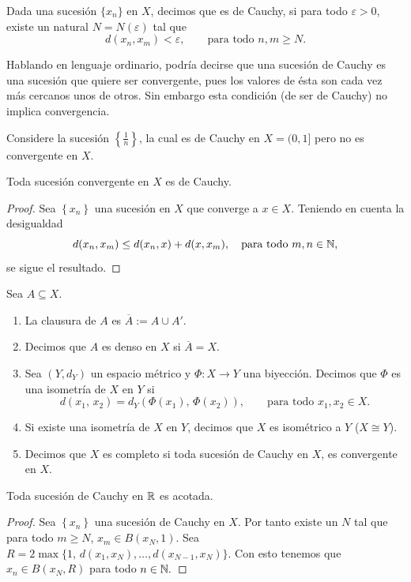 \begin{definicion}
Dada una sucesión $\{x_n\}$ en $X$, decimos que es de Cauchy, si para todo $\varepsilon >0$, existe un natural $N=N(\varepsilon)$ tal que \[d(x_n, x_m) <\varepsilon, \qquad \text{para todo $n,m \geq N$}.\]
\end{definicion}
Hablando en lenguaje ordinario, podría decirse que una sucesión de Cauchy es una sucesión que quiere ser convergente, pues los valores de ésta son cada vez más cercanos unos de otros. Sin embargo esta condición (de ser de Cauchy) no implica convergencia.

\begin{example}
Considere la sucesión $\left\{ \frac{1}{n}\right\}$, la cual es de Cauchy en $X=(0,1]$ pero no es convergente en $X$.
\end{example}

\begin{teorema}
Toda sucesión convergente en $X$ es de Cauchy.
\end{teorema}
\begin{proof}
Sea $\left\{x_n \right\}$ una sucesión en $X$ que converge a $x\in X$. Teniendo en cuenta la desigualdad
\[d(x_n, x_m)\leq d(x_n, x)+d(x, x_m), \quad \text{para todo $m,n\in \mathbb{N}$}, \]
se sigue el resultado.
\end{proof}

\begin{definicion}
Sea $A\subseteq X$.
\begin{enumerate}
    \item La clausura de $A$ es $\overline{A} :=A\cup A'$.
    \item Decimos que $A$ es denso en $X$ si $\overline{A}=X$.
    \item Sea $(Y, d_Y)$ un espacio métrico  y $\Phi: X\to Y$ una biyección. Decimos que $\Phi $ es una isometría de $X$ en $Y$ si
    \[d(x_1,\, x_2)=d_Y(\Phi (x_1),\, \Phi (x_2)), \qquad \text{para todo $x_1,x_2 \in X$}.\]
    \item Si existe una isometría de $X$ en $Y$, decimos que $X$ es isométrico a $Y$ ($X\cong Y$).
    \item Decimos que $X$ es completo si toda sucesión de Cauchy en $X$, es convergente en $X$.
\end{enumerate}
\end{definicion}

\begin{teorema}\label{cauchy-acota}
Toda sucesión de Cauchy en $\mathbb{R}$ es acotada.
\end{teorema}
\begin{proof}
Sea $\left\{x_n \right\}$ una sucesión de Cauchy en $X$. Por tanto existe un $N$ tal que para todo $m\geq N$, $x_m\in B(x_N, 1).$ Sea $R=2\max\{1, \, d(x_1, x_N),\dots, d(x_{N-1}, x_N)\}.$ Con esto tenemos que $x_n \in B(x_N, R)$ para todo $n\in \mathbb{N}.$
\end{proof}

